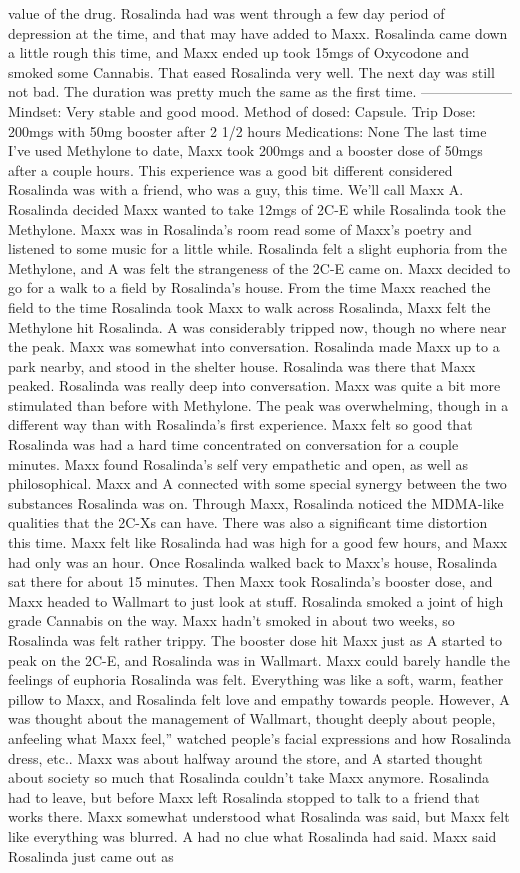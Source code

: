 \documentclass[12pt]{book}
\begin{document}
value of the drug. Rosalinda had was went through a few day period of depression at the time, and that may have added to Maxx. Rosalinda came down a little rough this time, and Maxx ended up took 15mgs of Oxycodone and smoked some Cannabis. That eased Rosalinda very well. The next day was still not bad. The duration was pretty much the same as the first time. -------------------- Mindset: Very stable and good mood. Method of dosed: Capsule. Trip Dose: 200mgs with 50mg booster after 2 1/2 hours Medications: None The last time I've used Methylone to date, Maxx took 200mgs and a booster dose of 50mgs after a couple hours. This experience was a good bit different considered Rosalinda was with a friend, who was a guy, this time. We'll call Maxx A. Rosalinda decided Maxx wanted to take 12mgs of 2C-E while Rosalinda took the Methylone. Maxx was in Rosalinda's room read some of Maxx's poetry and listened to some music for a little while. Rosalinda felt a slight euphoria from the Methylone, and A was felt the strangeness of the 2C-E came on. Maxx decided to go for a walk to a field by Rosalinda's house. From the time Maxx reached the field to the time Rosalinda took Maxx to walk across Rosalinda, Maxx felt the Methylone hit Rosalinda. A was considerably tripped now, though no where near the peak. Maxx was somewhat into conversation. Rosalinda made Maxx up to a park nearby, and stood in the shelter house. Rosalinda was there that Maxx peaked. Rosalinda was really deep into conversation. Maxx was quite a bit more stimulated than before with Methylone. The peak was overwhelming, though in a different way than with Rosalinda's first experience. Maxx felt so good that Rosalinda was had a hard time concentrated on conversation for a couple minutes. Maxx found Rosalinda's self very empathetic and open, as well as philosophical. Maxx and A connected with some special synergy between the two substances Rosalinda was on. Through Maxx, Rosalinda noticed the MDMA-like qualities that the 2C-Xs can have. There was also a significant time distortion this time. Maxx felt like Rosalinda had was high for a good few hours, and Maxx had only was an hour. Once Rosalinda walked back to Maxx's house, Rosalinda sat there for about 15 minutes. Then Maxx took Rosalinda's booster dose, and Maxx headed to Wallmart to just look at stuff. Rosalinda smoked a joint of high grade Cannabis on the way. Maxx hadn't smoked in about two weeks, so Rosalinda was felt rather trippy. The booster dose hit Maxx just as A started to peak on the 2C-E, and Rosalinda was in Wallmart. Maxx could barely handle the feelings of euphoria Rosalinda was felt. Everything was like a soft, warm, feather pillow to Maxx, and Rosalinda felt love and empathy towards people. However, A was thought about the management of Wallmart, thought deeply about people, anfeeling what Maxx feel,'' watched people's facial expressions and how Rosalinda dress, etc.. Maxx was about halfway around the store, and A started thought about society so much that Rosalinda couldn't take Maxx anymore. Rosalinda had to leave, but before Maxx left Rosalinda stopped to talk to a friend that works there. Maxx somewhat understood what Rosalinda was said, but Maxx felt like everything was blurred. A had no clue what Rosalinda had said. Maxx said Rosalinda just came out as 
\end{document}
